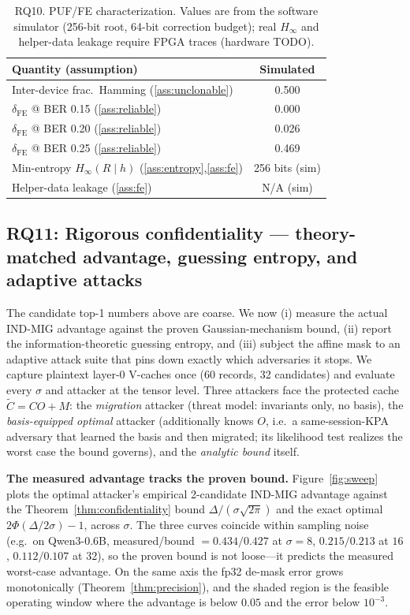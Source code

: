 \begin{table}[t]
\centering
\caption{RQ10. PUF/FE characterization. Values are from the software simulator (256-bit root, 64-bit correction budget); real $H_\infty$ and helper-data leakage require FPGA traces (hardware TODO).}
\label{tab:puf-hw}
\begin{tabular}{@{}lc@{}}
\toprule
Quantity (assumption) & Simulated \\
\midrule
Inter-device frac.\ Hamming (\ref{ass:unclonable}) & 0.500 \\
$\delta_{\mathrm{FE}}$ @ BER 0.15 (\ref{ass:reliable}) & 0.000 \\
$\delta_{\mathrm{FE}}$ @ BER 0.20 (\ref{ass:reliable}) & 0.026 \\
$\delta_{\mathrm{FE}}$ @ BER 0.25 (\ref{ass:reliable}) & 0.469 \\
Min-entropy $H_\infty(R\mid h)$ (\ref{ass:entropy},\ref{ass:fe}) & 256 bits (sim) \\
Helper-data leakage (\ref{ass:fe}) & N/A (sim) \\
\bottomrule
\end{tabular}
\end{table}

\subsection{RQ11: Rigorous confidentiality --- theory-matched advantage, guessing entropy, and adaptive attacks}
\label{sec:rigorous}

The candidate top-1 numbers above are coarse. We now (i) measure the actual \textsc{IND-MIG} advantage against the proven Gaussian-mechanism bound, (ii) report the information-theoretic guessing entropy, and (iii) subject the affine mask to an adaptive attack suite that pins down exactly which adversaries it stops. We capture plaintext layer-0 V-caches once (60 records, 32 candidates) and evaluate every $\sigma$ and attacker at the tensor level. Three attackers face the protected cache $\tilde C=CO+M$: the \emph{migration} attacker (threat model: invariants only, no basis), the \emph{basis-equipped optimal} attacker (additionally knows $O$, i.e.\ a same-session-KPA adversary that learned the basis and then migrated; its likelihood test realizes the worst case the bound governs), and the \emph{analytic bound} itself.

\textbf{The measured advantage tracks the proven bound.} Figure~\ref{fig:sweep} plots the optimal attacker's empirical 2-candidate \textsc{IND-MIG} advantage against the Theorem~\ref{thm:confidentiality} bound $\Delta/(\sigma\sqrt{2\pi})$ and the exact optimal $2\Phi(\Delta/2\sigma){-}1$, across $\sigma$. The three curves coincide within sampling noise (e.g.\ on Qwen3-0.6B, measured/bound $=0.434/0.427$ at $\sigma{=}8$, $0.215/0.213$ at $16$, $0.112/0.107$ at $32$), so the proven bound is not loose---it predicts the measured worst-case advantage. On the same axis the fp32 de-mask error grows monotonically (Theorem~\ref{thm:precision}), and the shaded region is the feasible operating window where the advantage is below $0.05$ and the error below $10^{-3}$.

